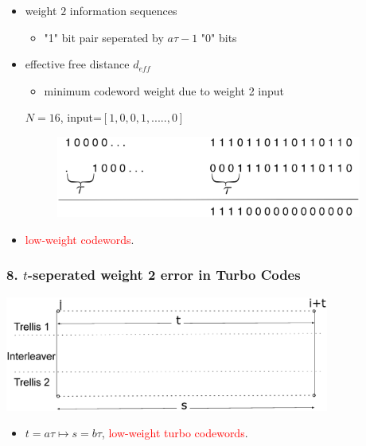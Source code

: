 \documentclass{beamer}  %
\begin{document}
\begin{frame}
\begin{itemize}
 
\setlength\itemsep{2em}

\frametitle{7. RSC Encoders and $a\tau$-seperated weight 2 errors}

\item weight $2$ information sequences 
\begin{itemize}
\item "1" bit pair seperated by $a\tau -1$ "0" bits
\end{itemize}

\item effective free distance $d_{eff}$
\begin{itemize}
\item minimum codeword weight due to weight 2 input
\end{itemize}

\begin{example}
\centering
 $N=16$, input=$[1, 0, 0, 1,.....,0]$
\begin{figure}
		\includegraphics[width=0.95\textwidth]{RSCExample.eps}
		
	\end{figure}
\end{example}
\item  \textcolor{red}{low-weight  codewords}.


\end{itemize}

\end{frame}

\begin{frame}
\frametitle{8. $t$-seperated weight 2 error in Turbo Codes}


\begin{center}
\includegraphics[width=0.8\textwidth]{weight2.eps}
\end{center}

\begin{itemize}
\item 
$t=a\tau
\mapsto s=b\tau$,
 \textcolor{red}{low-weight turbo codewords}.
 \end{itemize}
\end{frame}
\end{document}
